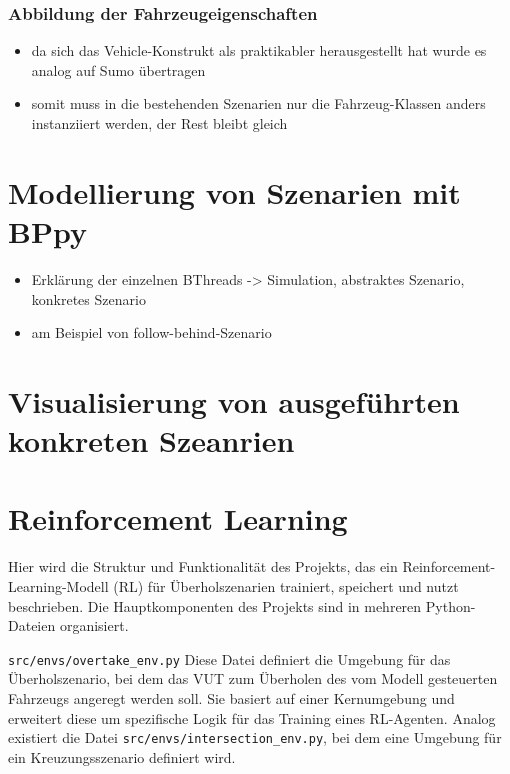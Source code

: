 \subsubsection{Abbildung der Fahrzeugeigenschaften}
\begin{itemize}
    \item da sich das Vehicle-Konstrukt als praktikabler herausgestellt hat wurde es analog auf Sumo übertragen
    \item somit muss in die bestehenden Szenarien nur die Fahrzeug-Klassen anders instanziiert werden, der Rest bleibt gleich
\end{itemize}
\section{Modellierung von Szenarien mit BPpy}
\begin{itemize}
    \item Erklärung der einzelnen BThreads -> Simulation, abstraktes Szenario, konkretes Szenario
    \item am Beispiel von follow-behind-Szenario
\end{itemize}

\section{Visualisierung von ausgeführten konkreten Szeanrien}
\section{Reinforcement Learning}
Hier wird die Struktur und Funktionalität des Projekts, das ein Reinforcement-Learning-Modell (RL) für Überholszenarien trainiert, speichert und nutzt beschrieben. Die Hauptkomponenten des Projekts sind in mehreren Python-Dateien organisiert.

\texttt{src/envs/overtake\_env.py}
Diese Datei definiert die Umgebung für das Überholszenario, bei dem das VUT zum Überholen des vom Modell gesteuerten Fahrzeugs angeregt werden soll. Sie basiert auf einer Kernumgebung und erweitert diese um spezifische Logik für das Training eines RL-Agenten.
Analog existiert die Datei \texttt{src/envs/intersection\_env.py}, bei dem eine Umgebung für ein Kreuzungsszenario definiert wird.

